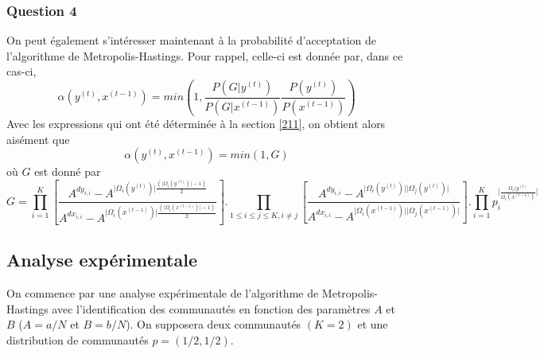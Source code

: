 \documentclass[a4paper, 11pt]{article}
\begin{document}
\subsubsection{Question 4}
On peut également s'intéresser maintenant à la probabilité d'acceptation de l'algorithme de Metropolis-Hastings. Pour rappel, celle-ci est donnée par, dans ce cas-ci,
\begin{equation}
    \alpha(y^{(t)}, x^{(t-1)})=min \left( 1,  \frac{P(G|y^{(t)})}{P(G|x^{(t-1)})} \frac{P(y^{(t)})}{P(x^{(t-1)})} \right)
\end{equation}
Avec les expressions qui ont été déterminée à la section \ref{211}, on obtient alors aisément que
\begin{equation}
    \alpha(y^{(t)}, x^{(t-1)})= min (1, G)
\end{equation}
où $G$ est donné par 
\begin{equation}
    G=\prod^K_{i=1} \left[ \frac{A^{dy_{i,i}}-A^{\lvert \Omega_i(y^{(t)})\rvert \frac{(\lvert \Omega_i(y^{(t)}) \rvert -1)}{2}}}{A^{dx_{i,i}}-A^{\lvert \Omega_i(x^{(t-1)})\rvert \frac{(\lvert \Omega_i(x^{(t-1)}) \rvert -1)}{2}}} \right]. \prod_{1\le i \le j \le K, i\ne j} \left[ \frac{A^{dy_{i,i}}-A^{\lvert \Omega_i(y^{(t)})\rvert  \lvert \Omega_j(y^{(t)})\rvert}}{A^{dx_{i,i}}-A^{\lvert \Omega_i(x^{(t-1)})\rvert \lvert \Omega_j(x^{(t-1)})\rvert}} \right]. \prod^K_{i=1} p_i^{ \lvert \frac{\Omega_i(y^{(t)}}{\Omega_i(x^{(t-1)})} \rvert}
\end{equation}
\newpage
\subsection{Analyse expérimentale} 
On commence par une analyse expérimentale de l'algorithme de Metropolis-Hastings avec l'identification des communautés en fonction des paramètres $A$ et $B$ ($A=a/N$ et $B=b/N$). On supposera deux communautés $(K=2)$ et une distribution de communautés $p=(1/2,1/2)$.
\end{document}
